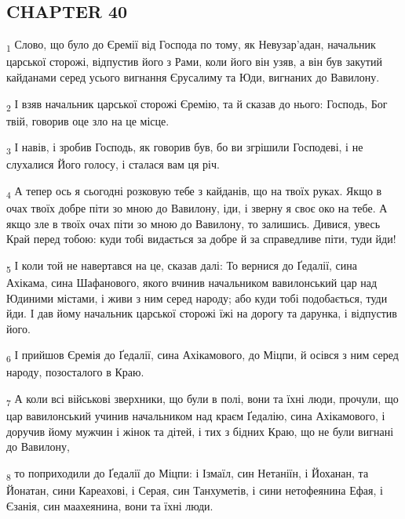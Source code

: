\subsection{CHAPTER 40}
\begin{tcolorbox}
\textsubscript{1} Слово, що було до Єремії від Господа по тому, як Невузар'адан, начальник царської сторожі, відпустив його з Рами, коли його він узяв, а він був закутий кайданами серед усього вигнання Єрусалиму та Юди, вигнаних до Вавилону.
\end{tcolorbox}
\begin{tcolorbox}
\textsubscript{2} І взяв начальник царської сторожі Єремію, та й сказав до нього: Господь, Бог твій, говорив оце зло на це місце.
\end{tcolorbox}
\begin{tcolorbox}
\textsubscript{3} І навів, і зробив Господь, як говорив був, бо ви згрішили Господеві, і не слухалися Його голосу, і сталася вам ця річ.
\end{tcolorbox}
\begin{tcolorbox}
\textsubscript{4} А тепер ось я сьогодні розковую тебе з кайданів, що на твоїх руках. Якщо в очах твоїх добре піти зо мною до Вавилону, іди, і зверну я своє око на тебе. А якщо зле в твоїх очах піти зо мною до Вавилону, то залишись. Дивися, увесь Край перед тобою: куди тобі видається за добре й за справедливе піти, туди йди!
\end{tcolorbox}
\begin{tcolorbox}
\textsubscript{5} І коли той не навертався на це, сказав далі: То вернися до Ґедалії, сина Ахікама, сина Шафанового, якого вчинив начальником вавилонський цар над Юдиними містами, і живи з ним серед народу; або куди тобі подобається, туди йди. І дав йому начальник царської сторожі їжі на дорогу та дарунка, і відпустив його.
\end{tcolorbox}
\begin{tcolorbox}
\textsubscript{6} І прийшов Єремія до Ґедалії, сина Ахікамового, до Міцпи, й осівся з ним серед народу, позосталого в Краю.
\end{tcolorbox}
\begin{tcolorbox}
\textsubscript{7} А коли всі військові зверхники, що були в полі, вони та їхні люди, прочули, що цар вавилонський учинив начальником над краєм Ґедалію, сина Ахікамового, і доручив йому мужчин і жінок та дітей, і тих з бідних Краю, що не були вигнані до Вавилону,
\end{tcolorbox}
\begin{tcolorbox}
\textsubscript{8} то поприходили до Ґедалії до Міцпи: і Ізмаїл, син Нетаніїн, і Йоханан, та Йонатан, сини Кареахові, і Серая, син Танхуметів, і сини нетофеянина Ефая, і Єзанія, син маахеянина, вони та їхні люди.
\end{tcolorbox}
